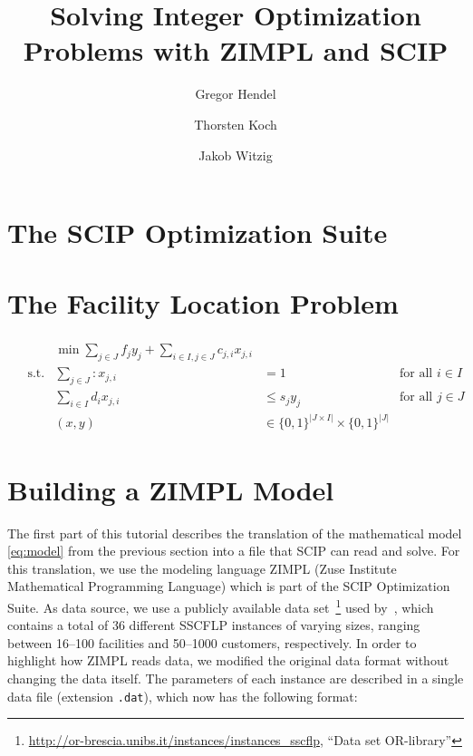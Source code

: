\documentclass[a4paper,10pt]{article}
\title{Solving Integer Optimization Problems with ZIMPL and SCIP}
\author{Gregor Hendel\and
        Thorsten Koch\and
        Jakob Witzig}
\begin{document}
\maketitle

\section{The SCIP Optimization Suite}


\section{The Facility Location Problem}


\begin{align}
%
\begin{aligned}
& & \min \sum\limits_{j \in J} f_{j} y_{j} + \sum\limits_{i\in I, j\in J} c_{j,i} x_{j,i}\\
&\text{s.t.}& \sum\limits_{j \in J} : x_{j,i} &= 1 & \text{for all $i \in I$}\\
&& \sum\limits_{i \in I} d_{i} x_{j,i} & \leq s_{j} y_{j} & \text{for all $j \in J$}\\
&& (x,y) & \in \{0,1\}^{|J \times I|} \times \{0,1\}^{|J|}
\end{aligned}
\tag{SSCFLP}\label{eq:model}
\end{align}


\section{Building a ZIMPL Model}

The first part of this tutorial describes the translation of the mathematical model \eqref{eq:model} from the previous section into a file that SCIP can read and solve.
%
For this translation, we use the modeling language ZIMPL (Zuse Institute Mathematical Programming Language) which is part of the SCIP Optimization Suite.
%
As data source, we use a publicly available data set~\footnote{\url{http://or-brescia.unibs.it/instances/instances_sscflp}, ``Data set OR-library''} used by~\cite{Guastaroba14},
which contains a total of 36 different SSCFLP instances of varying sizes, ranging between 16--100 facilities and 50--1000 customers, respectively.
%
In order to highlight how ZIMPL reads data, we modified the original data format without changing the data itself.
%
The parameters of each instance are described in a single data file (extension \texttt{.dat}), which now has the following format:
\end{document}

